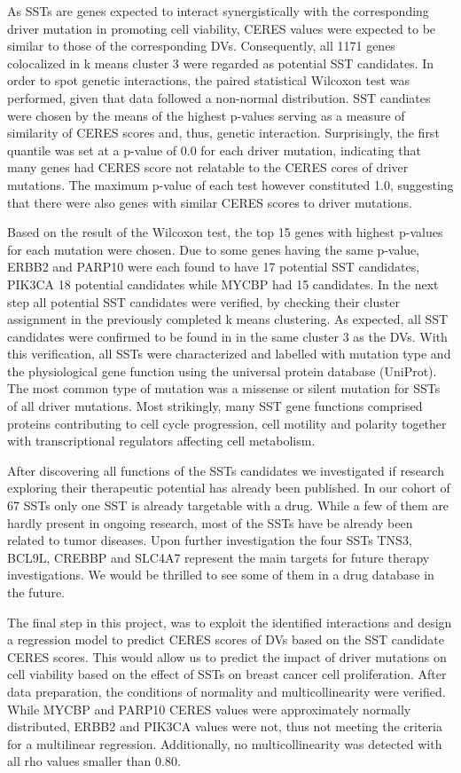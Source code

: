 \documentclass[]{article}
\begin{document}
As SSTs are genes expected to interact synergistically with the
corresponding driver mutation in promoting cell viability, CERES values
were expected to be similar to those of the corresponding DVs.
Consequently, all 1171 genes colocalized in k means cluster 3 were
regarded as potential SST candidates. In order to spot genetic
interactions, the paired statistical Wilcoxon test was performed, given
that data followed a non-normal distribution. SST candiates were chosen
by the means of the highest p-values serving as a measure of similarity
of CERES scores and, thus, genetic interaction. Surprisingly, the first
quantile was set at a p-value of 0.0 for each driver mutation,
indicating that many genes had CERES score not relatable to the CERES
cores of driver mutations. The maximum p-value of each test however
constituted 1.0, suggesting that there were also genes with similar
CERES scores to driver mutations.

Based on the result of the Wilcoxon test, the top 15 genes with highest
p-values for each mutation were chosen. Due to some genes having the
same p-value, ERBB2 and PARP10 were each found to have 17 potential SST
candidates, PIK3CA 18 potential candidates while MYCBP had 15
candidates. In the next step all potential SST candidates were verified,
by checking their cluster assignment in the previously completed k means
clustering. As expected, all SST candidates were confirmed to be found
in in the same cluster 3 as the DVs. With this verification, all SSTs
were characterized and labelled with mutation type and the physiological
gene function using the universal protein database (UniProt). The most
common type of mutation was a missense or silent mutation for SSTs of
all driver mutations. Most strikingly, many SST gene functions comprised
proteins contributing to cell cycle progression, cell motility and
polarity together with transcriptional regulators affecting cell
metabolism.

After discovering all functions of the SSTs candidates we investigated
if research exploring their therapeutic potential has already been
published. In our cohort of 67 SSTs only one SST is already targetable
with a drug. While a few of them are hardly present in ongoing research,
most of the SSTs have be already been related to tumor diseases. Upon
further investigation the four SSTs TNS3, BCL9L, CREBBP and SLC4A7
represent the main targets for future therapy investigations. We would
be thrilled to see some of them in a drug database in the future.

The final step in this project, was to exploit the identified
interactions and design a regression model to predict CERES scores of
DVs based on the SST candidate CERES scores. This would allow us to
predict the impact of driver mutations on cell viability based on the
effect of SSTs on breast cancer cell proliferation. After data
preparation, the conditions of normality and multicollinearity were
verified. While MYCBP and PARP10 CERES values were approximately
normally distributed, ERBB2 and PIK3CA values were not, thus not meeting
the criteria for a multilinear regression. Additionally, no
multicollinearity was detected with all rho values smaller than 0.80.
\end{document}
